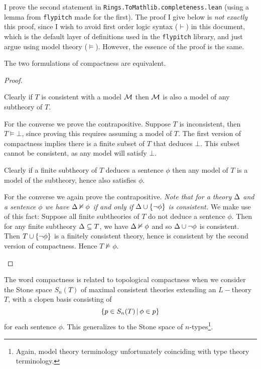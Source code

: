 I prove the second statement in
\texttt{Rings.ToMathlib.completeness.lean}
(using a lemma from \texttt{flypitch} made for the first).
The proof I give below is \textit{not exactly} this proof,
since I wish to avoid first order logic syntax ($\vdash$) in this document,
which is the default layer of definitions used in the \texttt{flypitch} library,
and just argue using model theory ($\vDash$).
However, the essence of the proof is the same.

\begin{prop}
  The two formulations of compactness are equivalent.
\end{prop}
\begin{proof}
  \begin{forward}
    Clearly if $T$ is consistent with a model $\mathcal{M}$ then $\mathcal{M}$
    is also a model of any subtheory of $T$.

    For the converse we prove the contrapositive.
    Suppose $T$ is inconsistent, then $T \vDash \bot$,
    since proving this requires assuming a model of $T$.
    The first version of compactness
    implies there is a finite subset of $T$ that deduces $\bot$.
    This subset cannot be consistent, as any model will satisfy $\bot$.
  \end{forward}

  \begin{backward}
    Clearly if a finite subtheory of $T$ deduces a sentence $\phi$ then
    any model of $T$ is a model of the subtheory, hence also satisfies $\phi$.

    For the converse we again prove the contrapositive.
    \textit{Note that for a theory $\Delta$ and a sentence $\phi$ we have
      $\Delta \nvDash \phi$ if and only if $\Delta \cup \left\{\neg \phi\right\}$ is consistent.}
    We make use of this fact:
    Suppose all finite subtheories of $T$ do not deduce a sentence $\phi$.
    Then for any finite subtheory $\Delta \subseteq T$, we have $\Delta \nvDash \phi$ and so
    $\Delta \cup {\neg \phi}$ is consistent.
    Then $T \cup \left\{\neg \phi\right\}$ is a finitely consistent theory,
    hence is consistent by the second version of compactness.
    Hence $T \nvDash \phi$.
  \end{backward}
\end{proof}

\begin{rmk} \cite{marker}
  The word compactness is related to topological compactness when we consider the
  Stone space $S_{n}(T)$
  of maximal consistent theories extending an $L-$theory $T$,
  with a clopen basis consisting of
  \[
      \left\{p \in S_n(T) \,|\, \phi \in p\right\}
  \]
  for each sentence $\phi$.
  This generalizes to the Stone space of $n$-types\footnote{
    Again, model theory terminology unfortunately coinciding with type theory terminology.
  }.
\end{rmk}

